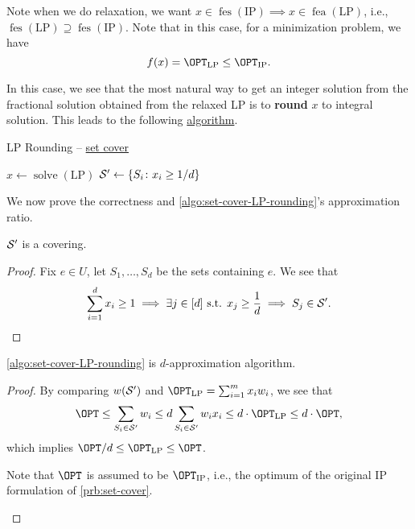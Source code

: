 \begin{note}
	Note when we do relaxation, we want \(x\in \mathop{\mathrm{fes}}(\text{IP}) \implies x\in \mathop{\mathrm{fea}}(\text{LP})\), i.e., \(\mathop{\mathrm{fes}}(\text{LP})\supseteq \mathop{\mathrm{fes}}(\text{IP})\). Note that in this case, for a minimization problem, we have
	\[
		f(x) = \OPT_\text{LP} \leq \OPT_\text{IP}.
	\]
\end{note}

In this case, we see that the most natural way to get an integer solution from the fractional solution obtained from the relaxed LP is to \textbf{round} \(x\) to integral solution. This leads to the following \hyperref[algo:set-cover-LP-rounding]{algorithm}.

\par
\begin{algorithm}[H]\label{algo:set-cover-LP-rounding}
	\DontPrintSemicolon
	\caption{LP Rounding -- \hyperref[prb:set-cover]{set cover}}
	\BlankLine
	\(x\gets\mathop{\mathrm{solve}}(\text{LP})\)
	\(\mathcal{\MakeUppercase{S}} ^\prime \gets \left\{ S_i \colon x_{i} \geq 1 / d \right\}\)\;
	\;
\end{algorithm}

We now prove the correctness and \autoref{algo:set-cover-LP-rounding}'s approximation ratio.
\begin{lemma}
	\(\mathcal{\MakeUppercase{S}} ^\prime \) is a covering.
\end{lemma}
\begin{proof}
	Fix \(e\in U\), let \(S_1, \ldots  , S_d\) be the sets containing \(e\). We see that
	\[
		\sum_{i=1}^{d} x_{i} \geq 1\implies \exists j\in[d] \text{ s.t. } x_j \geq \frac{1}{d} \implies S_j\in \mathcal{\MakeUppercase{S}} ^\prime.
	\]
\end{proof}

\begin{theorem}\label{thm:lec2-1}
	\autoref{algo:set-cover-LP-rounding} is \(d\)-approximation algorithm.
\end{theorem}
\begin{proof}
	By comparing \(w(\mathcal{\MakeUppercase{S}} ^\prime )\) and \(\OPT_\text{LP} = \sum_{i=1}^{m} x_{i} w_{i}\), we see that
	\[
		\OPT \leq \sum_{S_i\in \mathcal{\MakeUppercase{S}} ^\prime }w_i \leq d \sum_{S_i\in \mathcal{\MakeUppercase{S}} ^\prime }w_{i} x_{i} \leq d\cdot \OPT_\text{LP} \leq d\cdot \OPT,
	\]
	which implies \(\OPT / d\leq \OPT_\text{LP} \leq \OPT\).

	\begin{note}
		Note that \(\OPT\) is assumed to be \(\OPT_{\text{IP}}\), i.e., the optimum of the original IP formulation of \autoref{prb:set-cover}.
	\end{note}
\end{proof}

